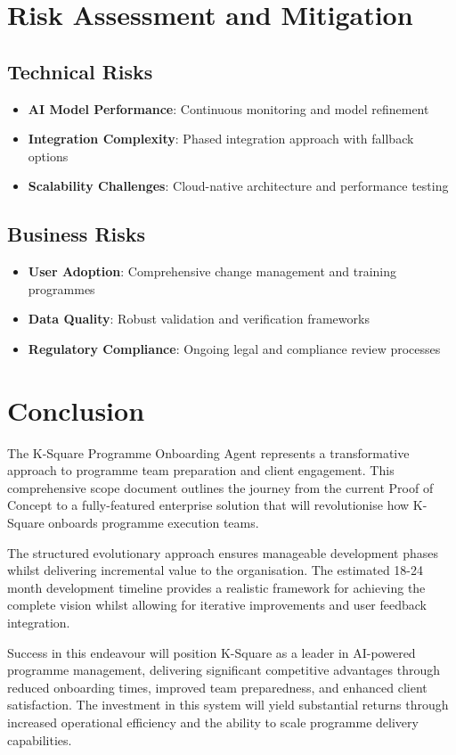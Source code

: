 \documentclass{article}
\begin{document}
\section{Risk Assessment and Mitigation}

\subsection{Technical Risks}
\begin{itemize}
    \item \textbf{AI Model Performance}: Continuous monitoring and model refinement
    \item \textbf{Integration Complexity}: Phased integration approach with fallback options
    \item \textbf{Scalability Challenges}: Cloud-native architecture and performance testing
\end{itemize}

\subsection{Business Risks}
\begin{itemize}
    \item \textbf{User Adoption}: Comprehensive change management and training programmes
    \item \textbf{Data Quality}: Robust validation and verification frameworks
    \item \textbf{Regulatory Compliance}: Ongoing legal and compliance review processes
\end{itemize}



\section{Conclusion}
The K-Square Programme Onboarding Agent represents a transformative approach to programme team preparation and client engagement. This comprehensive scope document outlines the journey from the current Proof of Concept to a fully-featured enterprise solution that will revolutionise how K-Square onboards programme execution teams.

The structured evolutionary approach ensures manageable development phases whilst delivering incremental value to the organisation. The estimated 18-24 month development timeline provides a realistic framework for achieving the complete vision whilst allowing for iterative improvements and user feedback integration.

Success in this endeavour will position K-Square as a leader in AI-powered programme management, delivering significant competitive advantages through reduced onboarding times, improved team preparedness, and enhanced client satisfaction. The investment in this system will yield substantial returns through increased operational efficiency and the ability to scale programme delivery capabilities.
\end{document}
